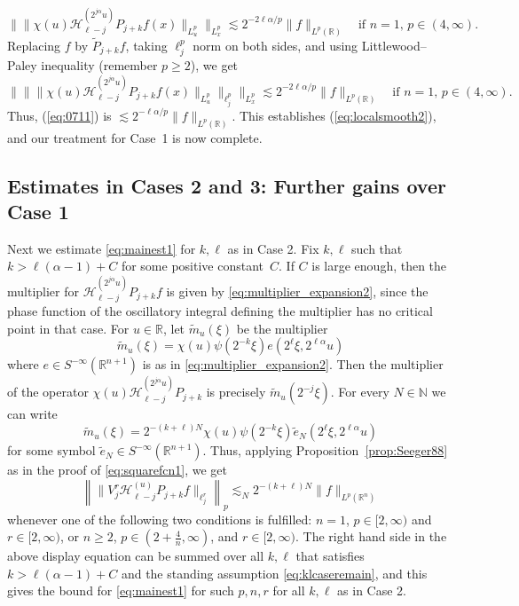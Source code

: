\documentclass[12pt,leqno]{amsart}
\def\R{\mathbb{R}}
\def\N{\mathbb{N}}
\theoremstyle{plain}
\numberwithin{equation}{section}
\begin{document}
\[ 
 \| \| \chi(u) \mathcal{H}^{(2^{j \alpha} u)}_{\ell-j} P_{j+k} f (x)  \|_{L^p_u}  \|_{L^p_x} \lesssim 2^{- 2\ell \alpha/p} \|f\|_{L^p(\R)} \quad \text{if $n = 1$, $p \in (4,\infty)$}.
\]
Replacing $f$ by $\tilde{P}_{j+k} f$, taking $\ell^p_j$ norm on both sides, and using Littlewood--Paley inequality (remember $p \geq 2$), we get 
\[ 
\| \| \| \chi(u) \mathcal{H}^{(2^{j \alpha} u)}_{\ell-j} P_{j+k} f (x)  \|_{L^p_u}  \|_{\ell^p_j} \|_{L^p_x} \lesssim 2^{- 2\ell \alpha/p} \|f\|_{L^p(\R)} \quad \text{if $n = 1$, $p \in (4,\infty)$}.
\]
Thus, (\ref{eq:0711}) is $\lesssim 2^{- \ell \alpha/p} \|f\|_{L^p(\R)}$. This establishes (\ref{eq:localsmooth2}), and our treatment for Case~1 is now complete.

\subsection{Estimates in Cases 2 and 3: Further gains over Case 1} \label{sect4.5}
Next we estimate \eqref{eq:mainest1} for $k, \ell$ as in Case 2. Fix $k, \ell$ such that $k > \ell (\alpha - 1) + C$ for some positive constant~$C$. If $C$ is large enough, then the multiplier for $\mathcal{H}^{(2^{j \alpha} u)}_{\ell-j} P_{j+k} f$ is given by \eqref{eq:multiplier_expansion2}, since the phase function of the oscillatory integral defining the multiplier has no critical point in that case. For $u \in \R$, let $\tilde{m}_u(\xi)$ be the multiplier  
\[
\tilde{m}_u(\xi) = \chi(u) \psi(2^{-k} \xi) e(2^{\ell} \xi, 2^{\ell \alpha} u)
\]
where $e \in S^{-\infty}(\R^{n+1})$ is as in \eqref{eq:multiplier_expansion2}. Then the multiplier of the operator $\chi(u) \mathcal{H}^{(2^{j \alpha} u)}_{\ell-j} P_{j+k}$ is precisely $\tilde{m}_u(2^{-j} \xi)$. For every $N \in \N$ we can write
\[
\tilde{m}_u(\xi) = 2^{-(k+\ell) N} \chi(u) \psi(2^{-k} \xi) \tilde{e}_N(2^{\ell} \xi, 2^{\ell \alpha} u)
\]
for some symbol $\tilde{e}_N \in S^{-\infty}(\R^{n+1})$. Thus, applying Proposition~\ref{prop:Seeger88} as in the proof of \eqref{eq:squarefcn1}, we get
\[ 
\left\| \|V_j^{r} \mathcal{H}^{(u)}_{\ell-j} P_{j+k} f \|_{\ell^r_j} \right\|_p \lesssim_N 2^{-(k+\ell) N} \|f\|_{L^p(\R^n)}
\]
whenever one of the following two conditions is fulfilled: $n = 1$, $p \in [2,\infty)$ and $r \in [2,\infty)$, or $n \geq 2$, $p \in (2 + \frac{4}{n},\infty)$, and $r \in [2,\infty)$. The right hand side in the above display equation can be summed over all $k, \ell$ that satisfies $k > \ell (\alpha -1)+C$ and the standing assumption \eqref{eq:klcaseremain}, and this gives the bound for \eqref{eq:mainest1} for such $p, n, r$ for all $k, \ell$ as in Case 2.\\
\end{document}
